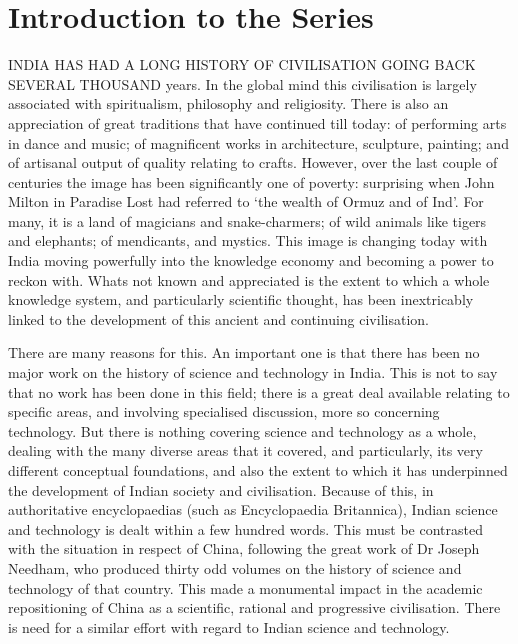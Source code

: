 \chapter*{Introduction to the Series}\label{preface2}

\vspace{-.5cm}


INDIA HAS HAD A LONG HISTORY OF CIVILISATION GOING BACK SEVERAL THOUSAND years. In the global mind this civilisation is largely associated with spiritualism, philosophy and religiosity. There is also an appreciation of great traditions that have continued till today: of performing arts in dance and music; of magnificent works in architecture, sculpture, painting; and of artisanal output of quality relating to crafts. However, over the last couple of centuries the image has been significantly one of poverty: surprising when John Milton in Paradise Lost had referred to ‘the wealth of Ormuz and of Ind’. For many, it is a land of magicians and snake-charmers; of wild animals like tigers and elephants; of mendicants, and mystics. This image is changing today with India moving powerfully into the knowledge economy and becoming a power to reckon with. Whats not known and appreciated is the extent to which a whole knowledge system, and particularly scientific thought, has been inextricably linked to the development of this ancient and continuing civilisation.

There are many reasons for this. An important one is that there has been no major work on the history of science and technology in India. This is not to say that no work has been done in this field; there is a great deal available relating to specific areas, and involving specialised discussion, more so concerning technology. But there is nothing covering science and technology as a whole, dealing with the many diverse areas that it covered, and particularly, its very different conceptual foundations, and also the extent to which it has underpinned the development of Indian society and civilisation. Because of this, in authoritative encyclopaedias (such as Encyclopaedia Britannica), Indian science and technology is dealt within a few hundred words. This must be contrasted with the situation in respect of China, following the great work of Dr Joseph Needham, who produced thirty odd volumes on the history of science  and technology of that country. This made a monumental impact in the academic repositioning of China as a scientific, rational and progressive civilisation. There is need for a similar effort with regard to Indian science and technology.


